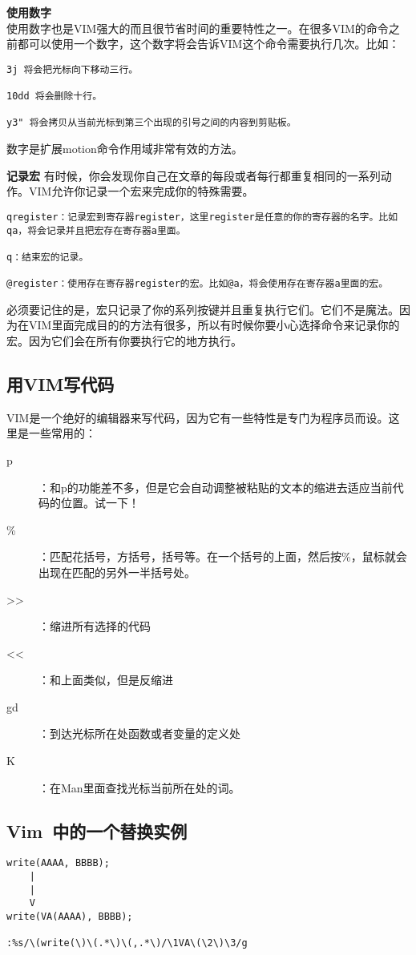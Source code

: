\textbf{使用数字}\\
使用数字也是VIM强大的而且很节省时间的重要特性之一。在很多VIM的命令之前都可以使用一个数字，这个数字将会告诉VIM这个命令需要执行几次。比如：
\begin{verbatim}
3j 将会把光标向下移动三行。

10dd 将会删除十行。

y3" 将会拷贝从当前光标到第三个出现的引号之间的内容到剪贴板。
\end{verbatim}
数字是扩展motion命令作用域非常有效的方法。

\textbf{记录宏} 
有时候，你会发现你自己在文章的每段或者每行都重复相同的一系列动作。VIM允许你记录一个宏来完成你的特殊需要。
\begin{verbatim}
qregister：记录宏到寄存器register，这里register是任意的你的寄存器的名字。比如qa，将会记录并且把宏存在寄存器a里面。

q：结束宏的记录。

@register：使用存在寄存器register的宏。比如@a，将会使用存在寄存器a里面的宏。
\end{verbatim}
必须要记住的是，宏只记录了你的系列按键并且重复执行它们。它们不是魔法。因为在VIM里面完成目的的方法有很多，所以有时候你要小心选择命令来记录你的宏。因为它们会在所有你要执行它的地方执行。

\subsection{用VIM写代码}
VIM是一个绝好的编辑器来写代码，因为它有一些特性是专门为程序员而设。这里是一些常用的：
\begin{description}
	\item[p]：和p的功能差不多，但是它会自动调整被粘贴的文本的缩进去适应当前代码的位置。试一下！
	\item[\%]：匹配花括号，方括号，括号等。在一个括号的上面，然后按\%，鼠标就会出现在匹配的另外一半括号处。
	\item[\textgreater\textgreater]：缩进所有选择的代码
	\item[\textless\textless]：和上面类似，但是反缩进
	\item[gd]：到达光标所在处函数或者变量的定义处
	\item[K]：在Man里面查找光标当前所在处的词。
\end{description}

\subsection{Vim~中的一个替换实例}
\begin{verbatim}
write(AAAA, BBBB);
	|
	|
	V
write(VA(AAAA), BBBB);

:%s/\(write(\)\(.*\)\(,.*\)/\1VA\(\2\)\3/g
\end{verbatim}

